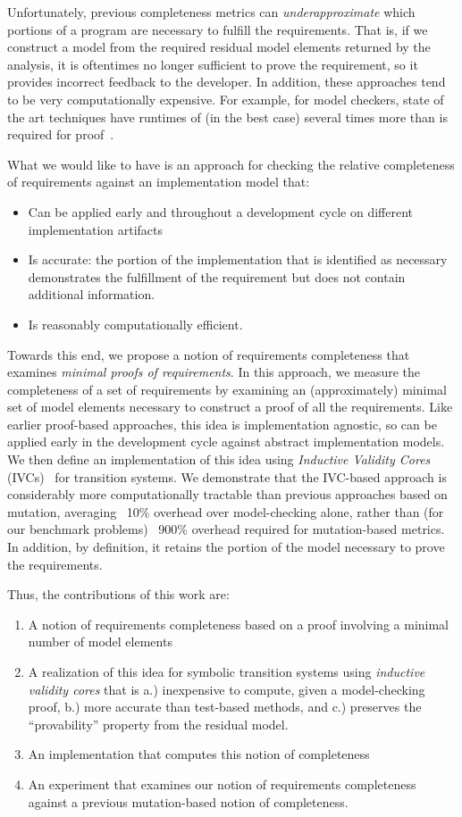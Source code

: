 Unfortunately, previous completeness metrics can {\em underapproximate} which portions of a program are necessary to fulfill the requirements.  That is, if we construct a model from the required residual model elements returned by the analysis, it is oftentimes no longer sufficient to prove the requirement, so it provides incorrect feedback to the developer.  In addition, these approaches tend to be very computationally expensive.  For example, for model checkers, state of the art techniques have runtimes of (in the best case) several times more than is required for proof~\cite{chockler2010coverage}.

What we would like to have is an approach for checking the relative completeness of requirements against an implementation model that:
\begin{itemize}
    \item Can be applied early and throughout a development cycle on different implementation artifacts
    \item Is accurate: the portion of the implementation that is identified as necessary demonstrates the
        fulfillment of the requirement but does not contain additional information.
    \item Is reasonably computationally efficient.
\end{itemize}

\noindent Towards this end, we propose a notion of requirements completeness that examines {\em minimal proofs of requirements}.  In this approach, we measure the completeness of a set of requirements by examining an (approximately) minimal set of model elements necessary to construct a proof of all the requirements.  Like earlier proof-based approaches, this idea is implementation agnostic, so can be applied early in the development cycle against abstract implementation models.  We then define an implementation of this idea using {\em Inductive Validity Cores} (IVCs)~\cite{Ghass16} for transition systems.  We demonstrate that the IVC-based approach is considerably more computationally tractable than previous approaches based on mutation, averaging ~10\% overhead over model-checking alone, rather than (for our benchmark problems) ~900\% overhead required for mutation-based metrics.  In addition, by definition, it retains the portion of the model necessary to prove the requirements.

Thus, the contributions of this work are:
\begin{enumerate}
\item A notion of requirements completeness based on a proof involving a minimal number of model elements
\item A realization of this idea for symbolic transition systems using {\em inductive validity cores} that is a.) inexpensive to compute, given a model-checking proof, b.) more accurate than test-based methods, and c.) preserves the ``provability'' property from the residual model.
\item An implementation that computes this notion of completeness
\item An experiment that examines our notion of requirements completeness against a previous mutation-based notion of completeness.
\end{enumerate}

